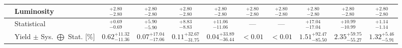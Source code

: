 \begin{tabular}{|cl||ccccccc|c||c|}
\hline
&Luminosity &  $^{+2.80}_{-2.80}$  &  $^{+2.80}_{-2.80}$  &  $^{+2.80}_{-2.80}$  &  $^{+2.80}_{-2.80}$  &  $^{+2.80}_{-2.80}$  &  $^{+2.80}_{-2.80}$  &  $^{+2.80}_{-2.80}$  &  $^{+2.80}_{-2.80}$  &  $^{+2.80}_{-2.80}$ \\ 
\hline
&Statistical &  $^{+0.69}_{-0.69}$  &  $^{+5.90}_{-5.90}$  &  $^{+8.83}_{-8.83}$  &  $^{+11.06}_{-11.06}$  & --- & --- &  $^{+17.04}_{-17.04}$  &  $^{+10.99}_{-10.99}$  &  $^{+1.14}_{-1.14}$ \\ 
\hline
\hline
&Yield $\pm$ Sys. $\bigoplus$ Stat. [\%] &  $0.62^{+11.32}_{-11.36}$  &  $0.07^{+17.04}_{-17.06}$  &  $0.11^{+32.67}_{-31.75}$  &  $0.04^{+33.89}_{-36.44}$  &  $<0.01$  &  $<0.01$  &  $1.51^{+92.47}_{-85.50}$  &  $2.35^{+59.75}_{-55.27}$  &  $1.32^{+5.46}_{-5.91}$ \\ 
\hline
\end{tabular}
